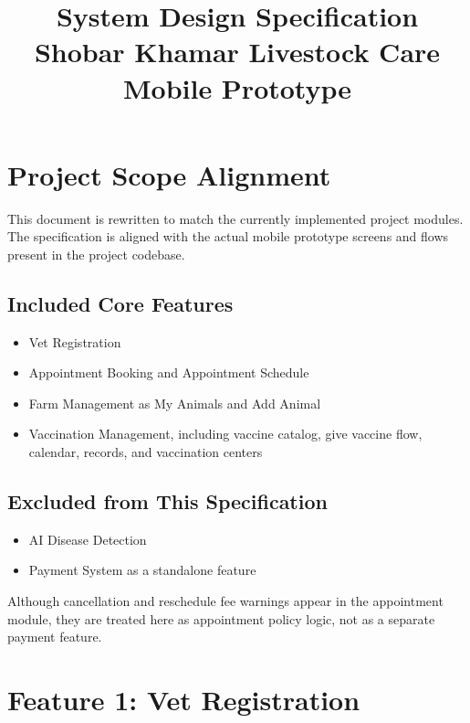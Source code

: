 \documentclass[12pt]{article}
\title{
    {\Large \textbf{System Design Specification}}\\[0.5em]
    {\large Shobar Khamar Livestock Care Mobile Prototype}
}
\author{}
\date{}
\begin{document}
\maketitle
\tableofcontents
\newpage

\section{Project Scope Alignment}

This document is rewritten to match the currently implemented project modules. The specification is aligned with the actual mobile prototype screens and flows present in the project codebase.

\subsection{Included Core Features}
\begin{itemize}
    \item Vet Registration
    \item Appointment Booking and Appointment Schedule
    \item Farm Management as My Animals and Add Animal
    \item Vaccination Management, including vaccine catalog, give vaccine flow, calendar, records, and vaccination centers
\end{itemize}

\subsection{Excluded from This Specification}
\begin{itemize}
    \item AI Disease Detection
    \item Payment System as a standalone feature
\end{itemize}

Although cancellation and reschedule fee warnings appear in the appointment module, they are treated here as appointment policy logic, not as a separate payment feature.

\newpage
\section{Feature 1: Vet Registration}
\end{document}
